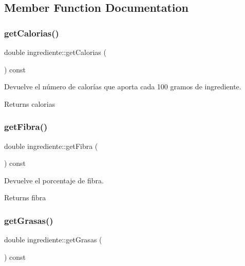 \subsection{Member Function Documentation}
\mbox{\label{classingrediente_ab61ade959dac30f2e025b806531d34cd}} 
\subsubsection{\texorpdfstring{get\+Calorias()}{getCalorias()}}
{\footnotesize\ttfamily double ingrediente\+::get\+Calorias (\begin{DoxyParamCaption}{ }\end{DoxyParamCaption}) const}



Devuelve el número de calorías que aporta cada 100 gramos de ingrediente. 

\begin{DoxyReturn}{Returns}
calorias 
\end{DoxyReturn}
\mbox{\label{classingrediente_a7abcffbf8f3a03861183514216125849}} 
\subsubsection{\texorpdfstring{get\+Fibra()}{getFibra()}}
{\footnotesize\ttfamily double ingrediente\+::get\+Fibra (\begin{DoxyParamCaption}{ }\end{DoxyParamCaption}) const}



Devuelve el porcentaje de fibra. 

\begin{DoxyReturn}{Returns}
fibra 
\end{DoxyReturn}
\mbox{\label{classingrediente_af4639a93a991a37158d137d438db84fc}} 
\subsubsection{\texorpdfstring{get\+Grasas()}{getGrasas()}}
{\footnotesize\ttfamily double ingrediente\+::get\+Grasas (\begin{DoxyParamCaption}{ }\end{DoxyParamCaption}) const}



